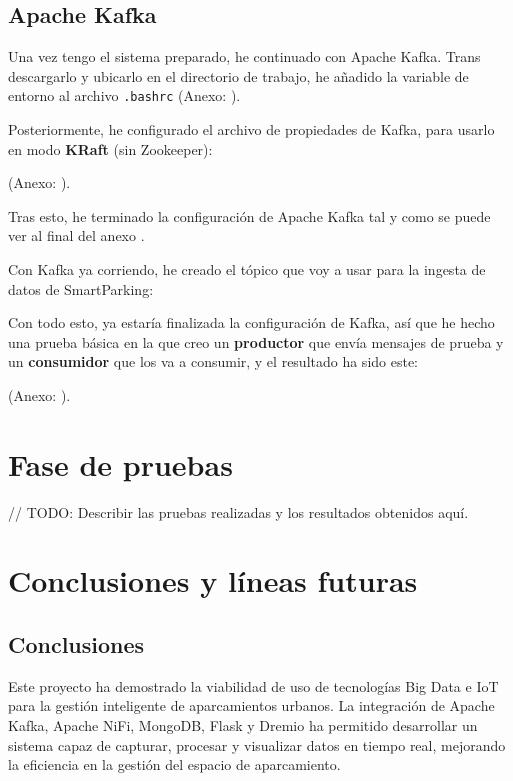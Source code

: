 \documentclass{../../../miPlantilla}
\begin{document}
\newpage

\subsection{Apache Kafka}
Una vez tengo el sistema preparado, he continuado con Apache Kafka. Trans descargarlo y ubicarlo en el directorio de trabajo, he añadido la 
variable de entorno al archivo \texttt{.bashrc} {\small(Anexo: )}.

Posteriormente, he configurado el archivo de propiedades de Kafka, para usarlo en modo \textbf{KRaft} (sin Zookeeper):
\begin{center}
  {\small(Anexo: )}.
\end{center}

Tras esto, he terminado la configuración de Apache Kafka tal y como se puede ver al final del anexo .

Con Kafka ya corriendo, he creado el tópico que voy a usar para la ingesta de datos de SmartParking:

Con todo esto, ya estaría finalizada la configuración de Kafka, así que he hecho una prueba básica en la que creo un \textbf{productor}
que envía mensajes de prueba y un \textbf{consumidor} que los va a consumir, y el resultado ha sido este:
\begin{center}
  {\small(Anexo: )}.
\end{center}

\newpage
\section{Fase de pruebas}
// TODO: Describir las pruebas realizadas y los resultados obtenidos aquí.

\section{Conclusiones y líneas futuras}
\subsection{Conclusiones}
Este proyecto ha demostrado la viabilidad de uso de tecnologías Big Data e IoT para la gestión inteligente de aparcamientos urbanos.
La integración de Apache Kafka, Apache NiFi, MongoDB, Flask y Dremio ha permitido desarrollar un sistema capaz de capturar, procesar
y visualizar datos en tiempo real, mejorando la eficiencia en la gestión del espacio de aparcamiento.
\end{document}
